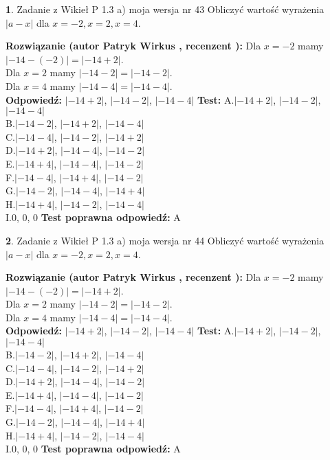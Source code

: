 \documentclass[12pt, a4paper]{article}
\theoremstyle{definition} %
\newtheorem{zad}{}
\newcommand{\zadStart}[1]{\begin{zad}#1\newline}
\newcommand{\zadStop}{\end{zad}}
\newcommand{\rozwStart}[2]{\noindent \textbf{Rozwiązanie (autor #1 , recenzent #2): }\newline}
\newcommand{\rozwStop}{\newline}
\newcommand{\odpStart}{\noindent \textbf{Odpowiedź:}\newline}
\newcommand{\odpStop}{\newline}
\newcommand{\testStart}{\noindent \textbf{Test:}\newline}
\newcommand{\testStop}{\newline}
\newcommand{\kluczStart}{\noindent \textbf{Test poprawna odpowiedź:}\newline}
\newcommand{\kluczStop}{\newline}
\begin{document}
\zadStart{Zadanie z Wikieł P 1.3 a) moja wersja nr 43}
Obliczyć wartość wyrażenia $|a - x|$ dla $x=-2,x=2,x=4$.
\zadStop
\rozwStart{Patryk Wirkus}{}
Dla $x = -2$ mamy $|-14 - (-2)| = |-14 + 2|$.\\
Dla $x = 2$ mamy $|-14 - 2| = |-14 - 2|$.\\
Dla $x = 4$ mamy $|-14 - 4| = |-14 - 4|$.\\
\rozwStop
\odpStart
$|-14 + 2|$, $|-14 - 2|$, $|-14 - 4|$
\odpStop
\testStart
A.$|-14 + 2|$, $|-14 - 2|$, $|-14 - 4|$\\
B.$|-14 - 2|$, $|-14 + 2|$, $|-14 - 4|$\\
C.$|-14 - 4|$, $|-14 - 2|$, $|-14 + 2|$\\
D.$|-14 + 2|$, $|-14 - 4|$, $|-14 - 2|$\\
E.$|-14 + 4|$, $|-14 - 4|$, $|-14 - 2|$\\
F.$|-14 - 4|$, $|-14 + 4|$, $|-14 - 2|$\\
G.$|-14 - 2|$, $|-14 - 4|$, $|-14 + 4|$\\
H.$|-14 + 4|$, $|-14 - 2|$, $|-14 - 4|$\\
I.$0$, $0$, $0$
\testStop
\kluczStart
A
\kluczStop



\zadStart{Zadanie z Wikieł P 1.3 a) moja wersja nr 44}
Obliczyć wartość wyrażenia $|a - x|$ dla $x=-2,x=2,x=4$.
\zadStop
\rozwStart{Patryk Wirkus}{}
Dla $x = -2$ mamy $|-14 - (-2)| = |-14 + 2|$.\\
Dla $x = 2$ mamy $|-14 - 2| = |-14 - 2|$.\\
Dla $x = 4$ mamy $|-14 - 4| = |-14 - 4|$.\\
\rozwStop
\odpStart
$|-14 + 2|$, $|-14 - 2|$, $|-14 - 4|$
\odpStop
\testStart
A.$|-14 + 2|$, $|-14 - 2|$, $|-14 - 4|$\\
B.$|-14 - 2|$, $|-14 + 2|$, $|-14 - 4|$\\
C.$|-14 - 4|$, $|-14 - 2|$, $|-14 + 2|$\\
D.$|-14 + 2|$, $|-14 - 4|$, $|-14 - 2|$\\
E.$|-14 + 4|$, $|-14 - 4|$, $|-14 - 2|$\\
F.$|-14 - 4|$, $|-14 + 4|$, $|-14 - 2|$\\
G.$|-14 - 2|$, $|-14 - 4|$, $|-14 + 4|$\\
H.$|-14 + 4|$, $|-14 - 2|$, $|-14 - 4|$\\
I.$0$, $0$, $0$
\testStop
\kluczStart
A
\kluczStop
\end{document}
